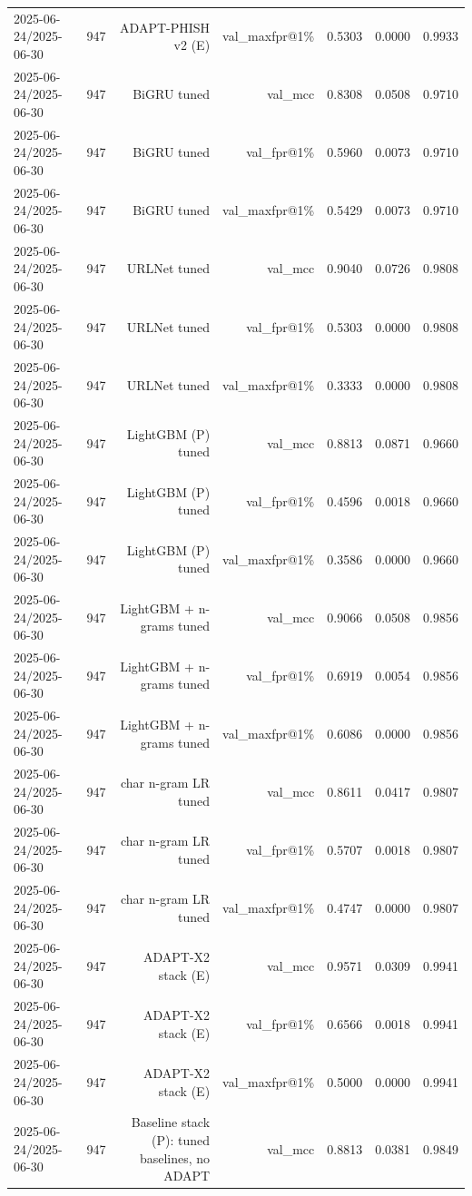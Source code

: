 \begin{table}[t]
\begin{tabular}{llrrrrr}
2025-06-24/2025-06-30 & 947 & ADAPT-PHISH v2 (E) & val\_maxfpr@1\% & 0.5303 & 0.0000 & 0.9933 \\
2025-06-24/2025-06-30 & 947 & BiGRU tuned & val\_mcc & 0.8308 & 0.0508 & 0.9710 \\
2025-06-24/2025-06-30 & 947 & BiGRU tuned & val\_fpr@1\% & 0.5960 & 0.0073 & 0.9710 \\
2025-06-24/2025-06-30 & 947 & BiGRU tuned & val\_maxfpr@1\% & 0.5429 & 0.0073 & 0.9710 \\
2025-06-24/2025-06-30 & 947 & URLNet tuned & val\_mcc & 0.9040 & 0.0726 & 0.9808 \\
2025-06-24/2025-06-30 & 947 & URLNet tuned & val\_fpr@1\% & 0.5303 & 0.0000 & 0.9808 \\
2025-06-24/2025-06-30 & 947 & URLNet tuned & val\_maxfpr@1\% & 0.3333 & 0.0000 & 0.9808 \\
2025-06-24/2025-06-30 & 947 & LightGBM (P) tuned & val\_mcc & 0.8813 & 0.0871 & 0.9660 \\
2025-06-24/2025-06-30 & 947 & LightGBM (P) tuned & val\_fpr@1\% & 0.4596 & 0.0018 & 0.9660 \\
2025-06-24/2025-06-30 & 947 & LightGBM (P) tuned & val\_maxfpr@1\% & 0.3586 & 0.0000 & 0.9660 \\
2025-06-24/2025-06-30 & 947 & LightGBM + n-grams tuned & val\_mcc & 0.9066 & 0.0508 & 0.9856 \\
2025-06-24/2025-06-30 & 947 & LightGBM + n-grams tuned & val\_fpr@1\% & 0.6919 & 0.0054 & 0.9856 \\
2025-06-24/2025-06-30 & 947 & LightGBM + n-grams tuned & val\_maxfpr@1\% & 0.6086 & 0.0000 & 0.9856 \\
2025-06-24/2025-06-30 & 947 & char n-gram LR tuned & val\_mcc & 0.8611 & 0.0417 & 0.9807 \\
2025-06-24/2025-06-30 & 947 & char n-gram LR tuned & val\_fpr@1\% & 0.5707 & 0.0018 & 0.9807 \\
2025-06-24/2025-06-30 & 947 & char n-gram LR tuned & val\_maxfpr@1\% & 0.4747 & 0.0000 & 0.9807 \\
2025-06-24/2025-06-30 & 947 & ADAPT-X2 stack (E) & val\_mcc & 0.9571 & 0.0309 & 0.9941 \\
2025-06-24/2025-06-30 & 947 & ADAPT-X2 stack (E) & val\_fpr@1\% & 0.6566 & 0.0018 & 0.9941 \\
2025-06-24/2025-06-30 & 947 & ADAPT-X2 stack (E) & val\_maxfpr@1\% & 0.5000 & 0.0000 & 0.9941 \\
2025-06-24/2025-06-30 & 947 & Baseline stack (P): tuned baselines, no ADAPT & val\_mcc & 0.8813 & 0.0381 & 0.9849 \\

\end{tabular}
\end{table}
